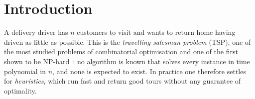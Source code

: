 \documentclass[11pt,a4paper]{article}
\newcommand{\tool}{\texttt{aco-tsp}}
\begin{document}
\begin{abstract}
    \noindent
    This report describes \tool, a C11 library and command-line tool that searches for short
    tours of the symmetric travelling salesman problem with ant colony optimisation. It states
    the problem and the representation of its solutions, derives the Ant System algorithm and
    three classic refinements, explains how they are implemented and verified, and evaluates
    them experimentally. On \num{500} random instances small enough for the
    optimum to be proven, Ant System finds it in \SIrange{89}{100}{\percent}
    of the runs, and in every run once it is combined with a 2-opt local search. On the
    instances of up to 100 cities supplied with the original assignment, that hybrid produces
    tours \SIrange{2.9}{11.9}{\percent} shorter than a strong deterministic baseline, in about
    half a second. The project started as second-year coursework; the report also documents
    what was wrong with that first version and how the rewrite addresses it.
\end{abstract}

{\linespread{0.98}\selectfont\tableofcontents}
\clearpage

\section{Introduction}
\label{sec:introduction}

A delivery driver has $n$ customers to visit and wants to return home having driven as
little as possible. This is the \emph{travelling salesman problem} (TSP), one of the most
studied problems of combinatorial optimisation and one of the first shown to be
NP-hard~\cite{karp1972reducibility}: no algorithm is known that solves every instance in
time polynomial in $n$, and none is expected to exist. In practice one therefore settles for
\emph{heuristics}, which run fast and return good tours without any guarantee of
optimality.
\end{document}
